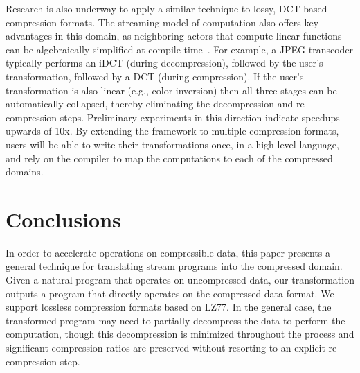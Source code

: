 Research is also underway to apply a similar technique to lossy,
DCT-based compression formats.  The streaming model of computation
also offers key advantages in this domain, as neighboring actors that
compute linear functions can be algebraically simplified at compile
time~\cite{aalamb}.  For example, a JPEG transcoder typically performs
an iDCT (during decompression), followed by the user's transformation,
followed by a DCT (during compression).  If the user's transformation
is also linear (e.g., color inversion) then all three stages can be
automatically collapsed, thereby eliminating the decompression and
re-compression steps.  Preliminary experiments in this direction
indicate speedups upwards of 10x.  By extending the framework to
multiple compression formats, users will be able to write their
transformations once, in a high-level language, and rely on the
compiler to map the computations to each of the compressed domains.

\section{Conclusions}
\label{sec:conclusions}


In order to accelerate operations on compressible data, this paper
presents a general technique for translating stream programs into the
compressed domain.  Given a natural program that operates on
uncompressed data, our transformation outputs a program that directly
operates on the compressed data format.  We support lossless
compression formats based on LZ77.  In the general case, the
transformed program may need to partially decompress the data to
perform the computation, though this decompression is minimized
throughout the process and significant compression ratios are
preserved without resorting to an explicit re-compression step.



